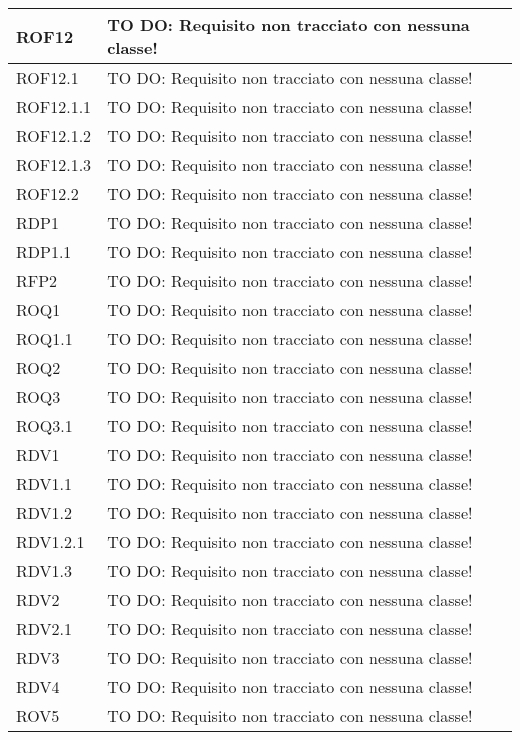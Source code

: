 \begin{center}
\begin{longtable}{| p{4cm} | p{8cm} |}
\hline
ROF12 & TO DO: Requisito non tracciato con nessuna classe! \\
\hline
ROF12.1 & TO DO: Requisito non tracciato con nessuna classe! \\
\hline
ROF12.1.1 & TO DO: Requisito non tracciato con nessuna classe! \\
\hline
ROF12.1.2 & TO DO: Requisito non tracciato con nessuna classe! \\
\hline
ROF12.1.3 & TO DO: Requisito non tracciato con nessuna classe! \\
\hline
ROF12.2 & TO DO: Requisito non tracciato con nessuna classe! \\
\hline
RDP1 & TO DO: Requisito non tracciato con nessuna classe! \\
\hline
RDP1.1 & TO DO: Requisito non tracciato con nessuna classe! \\
\hline
RFP2 & TO DO: Requisito non tracciato con nessuna classe! \\
\hline
ROQ1 & TO DO: Requisito non tracciato con nessuna classe! \\
\hline
ROQ1.1 & TO DO: Requisito non tracciato con nessuna classe! \\
\hline
ROQ2 & TO DO: Requisito non tracciato con nessuna classe! \\
\hline
ROQ3 & TO DO: Requisito non tracciato con nessuna classe! \\
\hline
ROQ3.1 & TO DO: Requisito non tracciato con nessuna classe! \\
\hline
RDV1 & TO DO: Requisito non tracciato con nessuna classe! \\
\hline
RDV1.1 & TO DO: Requisito non tracciato con nessuna classe! \\
\hline
RDV1.2 & TO DO: Requisito non tracciato con nessuna classe! \\
\hline
RDV1.2.1 & TO DO: Requisito non tracciato con nessuna classe! \\
\hline
RDV1.3 & TO DO: Requisito non tracciato con nessuna classe! \\
\hline
RDV2 & TO DO: Requisito non tracciato con nessuna classe! \\
\hline
RDV2.1 & TO DO: Requisito non tracciato con nessuna classe! \\
\hline
RDV3 & TO DO: Requisito non tracciato con nessuna classe! \\
\hline
RDV4 & TO DO: Requisito non tracciato con nessuna classe! \\
\hline
ROV5 & TO DO: Requisito non tracciato con nessuna classe! \\

\end{longtable}
\end{center}
